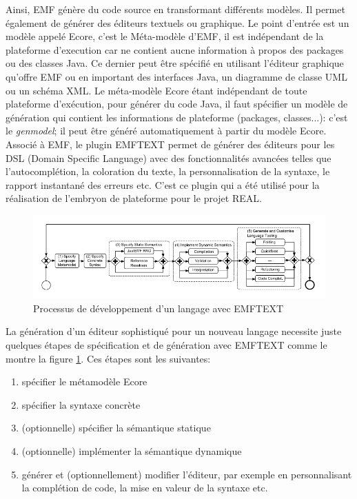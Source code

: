 	Ainsi, EMF génère du code source en transformant différents modèles. Il permet également de générer des éditeurs textuels ou graphique. Le point d'entrée est un modèle appelé Ecore, c'est le Méta-modèle d'EMF, il est indépendant de la plateforme d'execution car ne contient aucne information à propos des packages ou des classes Java. Ce dernier peut être spécifié en utilisant l'éditeur graphique qu'offre EMF ou en important des interfaces Java, un diagramme de classe UML ou un schéma XML. Le méta-modèle Ecore étant indépendant de toute plateforme d'exécution, pour générer du code Java, il faut spécifier un modèle de génération qui contient les informations de plateforme (packages, classes...): c'est le \textsl{genmodel}; il peut être généré automatiquement à partir du modèle Ecore. Associé à EMF, le plugin EMFTEXT permet de générer des éditeurs pour les DSL (Domain Specific Language) avec des fonctionnalités avancées telles que l'autocomplétion, la coloration du texte, la personnalisation de la syntaxe, le rapport instantané des erreurs etc. C'est ce plugin qui a été utilisé pour la réalisation de l'embryon de plateforme pour le projet REAL. 

\begin{figure}[h!]
  \includegraphics[scale=0.7]{images/EMFTEXT_process.png}
  \caption{Processus de développement d'un langage avec EMFTEXT}
  \label{fig:EMFTEXT_process}
\end{figure}

La génération d'un éditeur sophistiqué pour un nouveau langage necessite juste quelques étapes de spécification et de génération avec EMFTEXT comme le montre la figure \ref{fig:EMFTEXT_process}. Ces étapes sont les suivantes:
\begin{enumerate}
	\item spécifier le métamodèle Ecore
	\item spécifier la syntaxe concrète
	\item (optionnelle) spécifier la sémantique statique 
	\item (optionnelle) implémenter la sémantique dynamique 
	\item générer et (optionnellement) modifier l'éditeur, par exemple en personnalisant la complétion de code, la mise en valeur de la syntaxe etc.
\end{enumerate}

